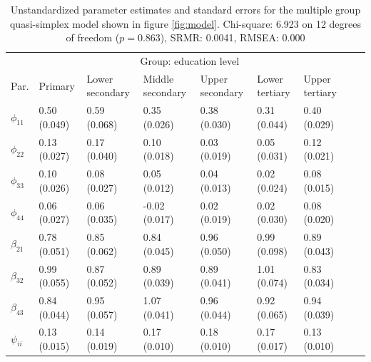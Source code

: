 \documentclass[a4paper, 11pt]{article}
\newcommand{\0}{\boldsymbol{0}}
\begin{document}
\begin{table}\begin{small}
\begin{tabularx}{\textwidth}{l*{8}{X}}
  \hline  \hline
  	& \multicolumn{6}{c}{Group: education level}\\	\cline{2-7}
    Par.  &       Primary         & Lower secondary & Middle secondary & Upper secondary & Lower tertiary & Upper tertiary\\
  \hline
$\phi_{11}$   & 0.50 (0.049) & 0.59 (0.068) & 0.35 (0.026) & 0.38 (0.030) & 0.31 (0.044) & 0.40 (0.029) \\ 
$\phi_{22}$   & 0.13 (0.027) & 0.17 (0.040) & 0.10 (0.018) & 0.03 (0.019) & 0.05 (0.031) & 0.12 (0.021) \\ 
$\phi_{33}$   & 0.10 (0.026) & 0.08 (0.027) & 0.05 (0.012) & 0.04 (0.013) & 0.02 (0.024) & 0.08 (0.015) \\ 
$\phi_{44}$   & 0.06 (0.027) & 0.06 (0.035) & -0.02 (0.017) & 0.02 (0.019) & 0.02 (0.030) & 0.08 (0.020) \\ 
$\beta_{21}$  & 0.78 (0.051) & 0.85 (0.062) & 0.84 (0.045) & 0.96 (0.050) & 0.99 (0.098) & 0.89 (0.043) \\ 
$\beta_{32}$  & 0.99 (0.055) & 0.87 (0.052) & 0.89 (0.039) & 0.89 (0.041) & 1.01 (0.074) & 0.83 (0.034) \\ 
$\beta_{43}$  & 0.84 (0.044) & 0.95 (0.057) & 1.07 (0.041) & 0.96 (0.044) & 0.92 (0.065) & 0.94 (0.039) \\ 
$\psi_{ii}$   & 0.13 (0.015) & 0.14 (0.019) & 0.17 (0.010) & 0.18 (0.010) & 0.17 (0.017) & 0.13 (0.010) \\ 
     \hline  \hline
\end{tabularx}\caption{Unstandardized parameter estimates and standard errors for the 
multiple group quasi-simplex model shown in figure \ref{fig:model}.
Chi-square:  6.923 on  12 degrees of freedom  ($p = 0.863$),  SRMR:  0.0041, RMSEA: 0.000}
\label{tab:results-unstandardized}
\end{small}\end{table}
\end{document}
